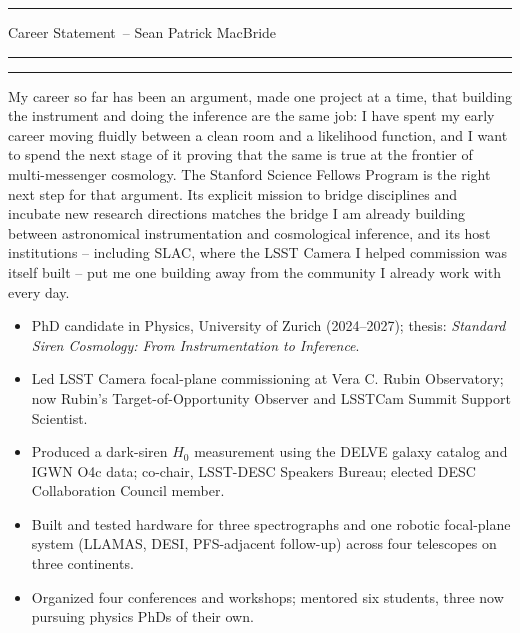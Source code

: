 \documentclass[11pt]{article}
\newcommand{\yourname}{Sean Patrick MacBride}
\newcommand{\soptitle}{Career Statement}
\begin{document}
\hrule
\begin{center}
    \Large\soptitle\ -- \yourname
\end{center}
\vspace{0pt}
\hrule
\vspace{0.5pt}
\hrule height 0.5pt
\vspace{3pt}
\thispagestyle{plain}

\normalsize
\noindent
My career so far has been an argument, made one project at a time, that building the instrument and doing the inference are the same job: I have spent my early career moving fluidly between a clean room and a likelihood function, and I want to spend the next stage of it proving that the same is true at the frontier of multi-messenger cosmology. The Stanford Science Fellows Program is the right next step for that argument. Its explicit mission to bridge disciplines and incubate new research directions matches the bridge I am already building between astronomical instrumentation and cosmological inference, and its host institutions -- including SLAC, where the LSST Camera I helped commission was itself built -- put me one building away from the community I already work with every day.

\begin{tcolorbox}[
  colback=blue!5!white,
  colframe=blue!75!black,
  boxsep=0.4mm, top=0.4mm, bottom=0.4mm, left=2mm, right=2mm,
  toptitle=0.4mm, bottomtitle=0.4mm, before skip=2.5pt, after skip=3.5pt,
  title=Career Snapshot
]
  \begin{itemize}
    \item PhD candidate in Physics, University of Zurich (2024--2027); thesis: \textit{Standard Siren Cosmology: From Instrumentation to Inference}.
    \item Led LSST Camera focal-plane commissioning at Vera C. Rubin Observatory; now Rubin's Target-of-Opportunity Observer and LSSTCam Summit Support Scientist.
    \item Produced a dark-siren $H_0$ measurement using the DELVE galaxy catalog and IGWN O4c data; co-chair, LSST-DESC Speakers Bureau; elected DESC Collaboration Council member.
    \item Built and tested hardware for three spectrographs and one robotic focal-plane system (LLAMAS, DESI, PFS-adjacent follow-up) across four telescopes on three continents.
    \item Organized four conferences and workshops; mentored six students, three now pursuing physics PhDs of their own.
  \end{itemize}
\end{tcolorbox}
\end{document}
